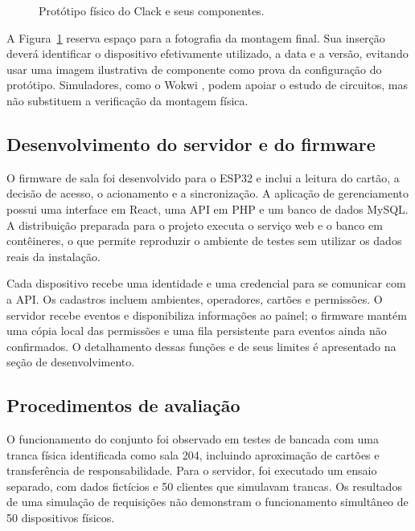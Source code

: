 \documentclass[12pt]{article}
\begin{document}
\begin{figure}[htbp]
  \centering
  \caption{Protótipo físico do Clack e seus componentes.}
  \label{fig:prototipo}
\end{figure}

A Figura~\ref{fig:prototipo} reserva espaço para a fotografia da montagem final. Sua inserção deverá identificar o dispositivo efetivamente utilizado, a data e a versão, evitando usar uma imagem ilustrativa de componente como prova da configuração do protótipo. Simuladores, como o Wokwi \cite{wokwi2026}, podem apoiar o estudo de circuitos, mas não substituem a verificação da montagem física.

\subsection{Desenvolvimento do servidor e do firmware}

O firmware de sala foi desenvolvido para o ESP32 e inclui a leitura do cartão, a decisão de acesso, o acionamento e a sincronização. A aplicação de gerenciamento possui uma interface em React, uma API em PHP e um banco de dados MySQL. A distribuição preparada para o projeto executa o serviço web e o banco em contêineres, o que permite reproduzir o ambiente de testes sem utilizar os dados reais da instalação.

Cada dispositivo recebe uma identidade e uma credencial para se comunicar com a API. Os cadastros incluem ambientes, operadores, cartões e permissões. O servidor recebe eventos e disponibiliza informações ao painel; o firmware mantém uma cópia local das permissões e uma fila persistente para eventos ainda não confirmados. O detalhamento dessas funções e de seus limites é apresentado na seção de desenvolvimento.

\subsection{Procedimentos de avaliação}

O funcionamento do conjunto foi observado em testes de bancada com uma tranca física identificada como sala 204, incluindo aproximação de cartões e transferência de responsabilidade. Para o servidor, foi executado um ensaio separado, com dados fictícios e 50 clientes que simulavam trancas. Os resultados de uma simulação de requisições não demonstram o funcionamento simultâneo de 50 dispositivos físicos.
\end{document}
